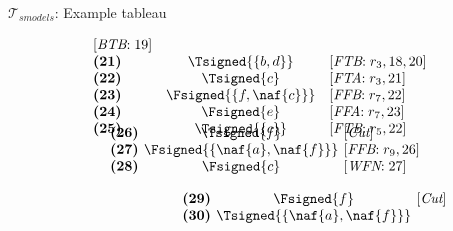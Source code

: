 \begin{frame}{$\mathcal{T}_{\textit{smodels}}$: Example tableau}
\begin{center}
\begin{minipage}[t]{16cm}
\begin{minipage}[t]{6cm}
\[\begin{array}{lcl}
  [\textit{BTB}{:}\;\text{19}]                     \\
\textbf{(21)}                                      &
  \Tsigned{\{b,d\}}                                &
  [\textit{FTB}{:}\;r_3, \text{18}, \text{20}]     \\
\textbf{(22)}                                      &
  \Tsigned{c}                                      &
  [\textit{FTA}{:}\;r_3, \text{21}]                \\
\textbf{(23)}                                      &
  \Fsigned{\{f,\naf{c}\}}                   &
  [\textit{FFB}{:}\;r_7, \text{22}]                \\
\textbf{(24)}                                      &
  \Fsigned{e}                                      &
  [\textit{FFA}{:}\;r_7, \text{23}]                \\
\textbf{(25)}                                      &
  \Tsigned{\{c\}}                                  &
  [\textit{FTB}{:}\;r_5, \text{22}]
\vspace{-0.7cm}
\end{array}
\]
%
\begin{minipage}[t]{1cm}
\[
\hspace{0.25cm}
\begin{array}{l@{~~}c@{~~}l}
\textbf{(26)}                                      &
  \Tsigned{f}                                      &
  [\textit{Cut}]                                   \\
\textbf{(27)}                                      & \hspace{-0.1cm}
  \Fsigned{\{\naf{a},\naf{f}\}}      \hspace{-0.1cm} &
  [\textit{FFB}{:}\;r_9, \text{26}]                \\
\textbf{(28)}                                      &
  \Fsigned{c}                                      &
  [\textit{WFN}{:}\;\text{27}]
\end{array}
\]
\end{minipage}
%
\begin{minipage}[t]{2cm}
\[
\hspace{2.75cm}
\begin{array}{l@{~~}c@{~~}l}
\textbf{(29)}                                      &
  \Fsigned{f}                                      &
  [\textit{Cut}]                                   \\
\textbf{(30)}                                      & \hspace{-0.1cm}
  \Tsigned{\{\naf{a},\naf{f}\}}      \hspace{-0.1cm} &

\end{array}\]
\end{minipage}
\end{minipage}
\end{minipage}
\end{center}
\end{frame}
